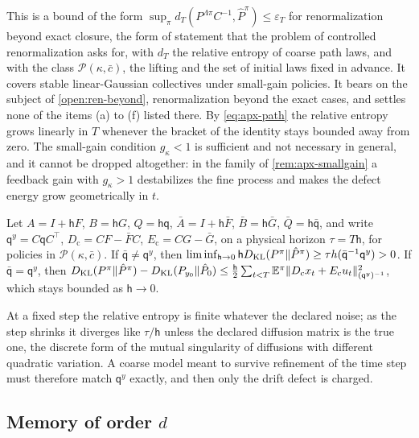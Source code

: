 This is a bound of the form $\sup_{\pi}d_T(P^{\Lambda\pi}C^{-1},\hat P^\pi)\le\varepsilon_T$ for renormalization beyond exact closure, the form of statement that the problem of controlled renormalization asks for, with $d_T$ the relative entropy of coarse path laws, and with the class $\mathcal P(\kappa,\bar c)$, the lifting and the set of initial laws fixed in advance. It covers stable linear-Gaussian collectives under small-gain policies. It bears on the subject of \cref{open:ren-beyond}, renormalization beyond the exact cases, and settles none of the items (a) to (f) listed there. By \cref{eq:apx-path} the relative entropy grows linearly in $T$ whenever the bracket of the identity stays bounded away from zero. The small-gain condition $g_\kappa<1$ is sufficient and not necessary in general, and it cannot be dropped altogether: in the family of \cref{rem:apx-smallgain} a feedback gain with $g_\kappa>1$ destabilizes the fine process and makes the defect energy grow geometrically in $t$.

\begin{proposition}\label{prop:apx-timestep}
Let $A=I+\mathsf hF$, $B=\mathsf hG$, $Q=\mathsf h\mathsf q$, $\bar A=I+\mathsf h\bar F$, $\bar B=\mathsf h\bar G$, $\bar Q=\mathsf h\bar{\mathsf q}$, and write $\mathsf q^y=C\mathsf qC^\top$, $D_{\mathrm c}=CF-\bar FC$, $E_{\mathrm c}=CG-\bar G$, on a physical horizon $\tau=T\mathsf h$, for policies in $\mathcal P(\kappa,\bar c)$. If $\bar{\mathsf q}\ne\mathsf q^y$, then $\liminf_{\mathsf h\to0}\mathsf hD_{\mathrm{KL}}(P^\pi\Vert\hat P^\pi)\ge\tau h(\bar{\mathsf q}^{-1}\mathsf q^y)>0$. If $\bar{\mathsf q}=\mathsf q^y$, then $D_{\mathrm{KL}}(P^\pi\Vert\hat P^\pi)-D_{\mathrm{KL}}(P_{y_0}\Vert\hat P_0)\le\frac{\mathsf h}{2}\sum_{t<T}\mathbb{E}^\pi\Vert D_{\mathrm c}x_t+E_{\mathrm c}u_t\Vert^2_{(\mathsf q^y)^{-1}}$, which stays bounded as $\mathsf h\to0$.
\end{proposition}

At a fixed step the relative entropy is finite whatever the declared noise; as the step shrinks it diverges like $\tau/\mathsf h$ unless the declared diffusion matrix is the true one, the discrete form of the mutual singularity of diffusions with different quadratic variation. A coarse model meant to survive refinement of the time step must therefore match $\mathsf q^y$ exactly, and then only the drift defect is charged.

\subsection{Memory of order $d$}


